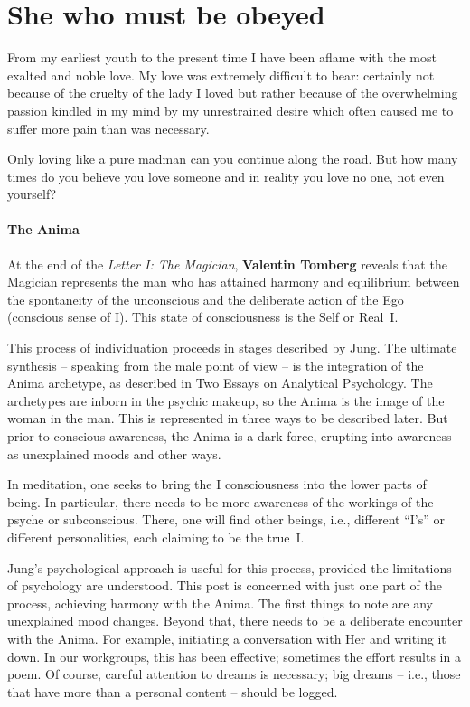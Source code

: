 \section{She who must be obeyed}

\begin{quotex}
From my earliest youth to the present time I have been aflame with the most exalted and noble love. My love was extremely difficult to bear: certainly not because of the cruelty of the lady I loved but rather because of the overwhelming passion kindled in my mind by my unrestrained desire which often caused me to suffer more pain than was necessary. 

Only loving like a pure madman can you continue along the road. But how many times do you believe you love someone and in reality you love no one, not even yourself? 

\end{quotex}
\paragraph{The Anima}
At the end of the \emph{Letter I: The Magician}, \textbf{Valentin Tom\-berg} reveals that the Magician represents the man who has attained harmony and equilibrium between the spontaneity of the unconscious and the deliberate action of the Ego (conscious sense of I). This state of consciousness is the Self or Real~I.

This process of individuation proceeds in stages described by Jung. The ultimate synthesis – speaking from the male point of view – is the integration of the Anima archetype, as described in Two Essays on Analytical Psychology. The archetypes are inborn in the psychic makeup, so the Anima is the image of the woman in the man. This is represented in three ways to be described later. But prior to conscious awareness, the Anima is a dark force, erupting into awareness as unexplained moods and other ways.

In meditation, one seeks to bring the I consciousness into the lower parts of being. In particular, there needs to be more awareness of the workings of the psyche or subconscious. There, one will find other beings, i.e., different “I's” or different personalities, each claiming to be the true~I.

Jung's psychological approach is useful for this process, provided the limitations of psychology are understood. This post is concerned with just one part of the process, achieving harmony with the Anima. The first things to note are any unexplained mood changes. Beyond that, there needs to be a deliberate encounter with the Anima. For example, initiating a conversation with Her and writing it down. In our workgroups, this has been effective; sometimes the effort results in a poem. Of course, careful attention to dreams is necessary; big dreams – i.e., those that have more than a personal content – should be logged.


